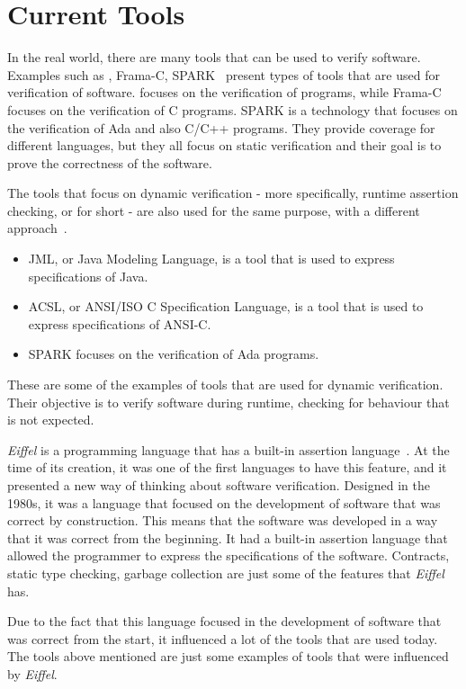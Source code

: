 \section{Current Tools}
\label{sec:current_tools}

In the real world, there are many tools that can be used to verify software. 
Examples such as \why, Frama-C, SPARK~\cite{Kosmatov2014} present types of tools that are used 
for verification of software. \why focuses on the verification of \ocaml programs, while Frama-C 
focuses on the verification of C programs. SPARK is a technology that focuses on the verification 
of Ada and also C/C++ programs. They provide coverage for different languages, but they all 
focus on static verification and their goal is to prove the correctness of the software.

The tools that focus on dynamic verification - more specifically, runtime assertion checking, 
or \rac for short - are also used for the same purpose, with a different approach~\cite{Maurica2018}. 
\begin{itemize}
  \item JML, or Java Modeling Language, is a tool that is used to express specifications of Java.
  \item ACSL, or ANSI/ISO C Specification Language, is a tool that is used to express specifications of ANSI-C.
  \item SPARK focuses on the verification of Ada programs.
\end{itemize}
These are some of the examples of tools that are used for dynamic verification. Their objective 
is to verify software during runtime, checking for behaviour that is not expected.

\textit{Eiffel} is a programming language that has a built-in assertion language~\cite{Maurica2018}. 
At the time of its creation, it was one of the first languages to have this feature, and it presented 
a new way of thinking about software verification. Designed in the 1980s, it was a language that 
focused on the development of software that was correct by construction. This means that the 
software was developed in a way that it was correct from the beginning. It had a built-in assertion 
language that allowed the programmer to express the specifications of the software. Contracts, 
static type checking, garbage collection are just some of the features that \textit{Eiffel} has. 

Due to the fact that this language focused in the development of software that was correct from the 
start, it influenced a lot of the tools that are used today. The tools above mentioned are 
just some examples of tools that were influenced by \textit{Eiffel}.

